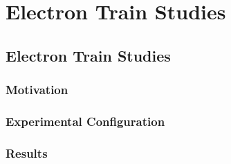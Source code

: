 \chapter{Electron Train Studies}\label{ch:Studies} %

\section{Electron Train Studies}
\subsection{Motivation}
\subsection{Experimental Configuration}
\subsection{Results}


